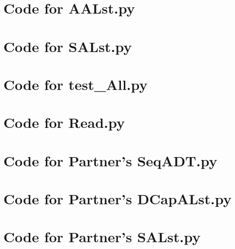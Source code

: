 \documentclass[12pt]{article}
\begin{document}
\newpage

\section{Code for AALst.py}

\noindent 

\newpage

\section{Code for SALst.py}

\noindent 

\newpage

\section{Code for test_All.py}

\noindent 

\newpage

\section{Code for Read.py}

\noindent 

\newpage

\section{Code for Partner's SeqADT.py}

\noindent 

\newpage

\section{Code for Partner's DCapALst.py}

\noindent 

\newpage

\section{Code for Partner's SALst.py}

\noindent 
\end{document}
